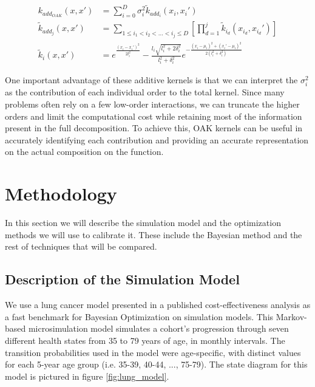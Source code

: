 \documentclass{IOS-Book-Article}
\begin{document}
	\begin{equation} \label{eq:additive-orthogonal}
		\begin{aligned}
			k_{add_{OAK}}(x,x') &= \sum_{i=0}^D{\sigma_i^2  \tilde{k}_{add_i}(x_i,x_i')} \\
			\tilde{k}_{add_j}(x,x') &= \sum_{1\leq i_1 < i_2 < \ldots < i_j\leq D} \left[\prod_{d=1}^{j} \tilde{k}_{i_d}(x_{i_d},x_{i_d}') \right]\\		
			\tilde{k}_i(x,x') &= e^{\frac{(x_i-x_i')^2}{2l_i^2}} - \frac{l_i\sqrt{l_i^2 + 2\delta_i^2}}{l_i^2 + \delta_i^2} e^{-\frac{(x_i-\mu_i)^2 + (x_i'-\mu_i)^2}{2(l_i^2 + \delta_i^2)}}
		\end{aligned}
	\end{equation}
	
	One important advantage of these additive kernels is that we can interpret the $\sigma_i^2$ as the contribution of each individual order to the total kernel. Since many problems often rely on a few low-order interactions, we can truncate the higher orders and limit the computational cost while retaining most of the information present in the full decomposition. To achieve this, OAK kernels can be useful in accurately identifying each contribution and providing an accurate representation on the actual composition on the function.
	
	\section{Methodology}
	In this section we will describe the simulation model and the optimization methods we will use to calibrate it. These include the Bayesian method and the rest of techniques that will be compared.
	
	\subsection{Description of the Simulation Model}
	We use a lung cancer model presented in a published cost-effectiveness analysis\cite{lung-model} as a fast benchmark for Bayesian Optimization on simulation models. This Markov-based microsimulation model simulates a cohort's progression through seven different health states from 35 to 79 years of age, in monthly intervals. The transition probabilities used in the model were age-specific, with distinct values for each 5-year age group (i.e. 35-39, 40-44, ..., 75-79). The state diagram for this model is pictured in figure \ref{fig:lung_model}.
	
\end{document}
